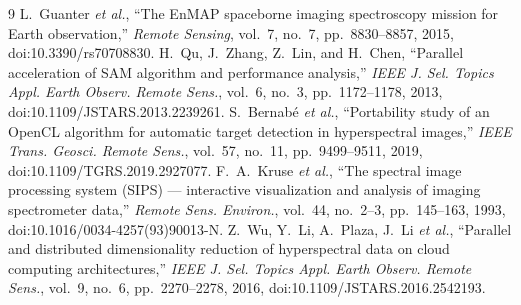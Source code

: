 \documentclass[conference]{IEEEtran}
\begin{document}
\begin{thebibliography}{9}
 L.~Guanter \emph{et al.}, ``The EnMAP spaceborne
imaging spectroscopy mission for Earth observation,'' \emph{Remote Sensing},
vol.~7, no.~7, pp.~8830--8857, 2015, doi:10.3390/rs70708830.
 H.~Qu, J.~Zhang, Z.~Lin, and H.~Chen, ``Parallel
acceleration of SAM algorithm and performance analysis,'' \emph{IEEE J. Sel.
Topics Appl. Earth Observ. Remote Sens.}, vol.~6, no.~3, pp.~1172--1178, 2013,
doi:10.1109/JSTARS.2013.2239261.
 S.~Bernab\'e \emph{et al.}, ``Portability study of
an OpenCL algorithm for automatic target detection in hyperspectral images,''
\emph{IEEE Trans. Geosci. Remote Sens.}, vol.~57, no.~11, pp.~9499--9511, 2019,
doi:10.1109/TGRS.2019.2927077.
 F.~A.~Kruse \emph{et al.}, ``The spectral image
processing system (SIPS) --- interactive visualization and analysis of imaging
spectrometer data,'' \emph{Remote Sens. Environ.}, vol.~44, no.~2--3, pp.~145--163,
1993, doi:10.1016/0034-4257(93)90013-N.
 Z.~Wu, Y.~Li, A.~Plaza, J.~Li \emph{et al.}, ``Parallel
and distributed dimensionality reduction of hyperspectral data on cloud
computing architectures,'' \emph{IEEE J. Sel. Topics Appl. Earth Observ. Remote
Sens.}, vol.~9, no.~6, pp.~2270--2278, 2016, doi:10.1109/JSTARS.2016.2542193.
\end{thebibliography}
\end{document}
